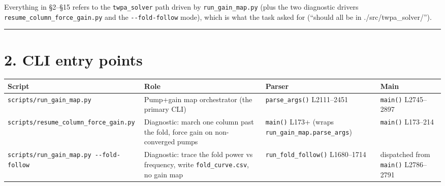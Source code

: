 \documentclass[
  10pt,
]{article}
\newcounter{none} %
\begin{document}
Everything in §2--§15 refers to the \texttt{twpa\_solver} path driven by
\texttt{run\_gain\_map.py} (plus the two diagnostic drivers
\texttt{resume\_column\_force\_gain.py} and the \texttt{-\/-fold-follow}
mode), which is what the task asked for (``should all be in
./src/twpa\_solver/'').

\begin{center}\rule{0.5\linewidth}{0.5pt}\end{center}

\section{2. CLI entry points}\label{cli-entry-points}

{\def\LTcaptype{none} %
\begin{longtable}[]{@{}
  >{\raggedright\arraybackslash}p{}
  >{\raggedright\arraybackslash}p{}
  >{\raggedright\arraybackslash}p{}
  >{\raggedright\arraybackslash}p{}@{}}
\toprule\noalign{}
\begin{minipage}[b]{\linewidth}\raggedright
Script
\end{minipage} & \begin{minipage}[b]{\linewidth}\raggedright
Role
\end{minipage} & \begin{minipage}[b]{\linewidth}\raggedright
Parser
\end{minipage} & \begin{minipage}[b]{\linewidth}\raggedright
Main
\end{minipage} \\
\midrule\noalign{}
\endhead
\bottomrule\noalign{}
\endlastfoot
\texttt{scripts/run\_gain\_map.py} & Pump+gain map orchestrator (the
primary CLI) & \texttt{parse\_args()} L2111--2451 & \texttt{main()}
L2745--2897 \\
\texttt{scripts/resume\_column\_force\_gain.py} & Diagnostic: march one
column past the fold, force gain on non-converged pumps &
\texttt{main()} L173+ (wraps \texttt{run\_gain\_map.parse\_args}) &
\texttt{main()} L173--214 \\
\texttt{scripts/run\_gain\_map.py\ -\/-fold-follow} & Diagnostic: trace
the fold power vs frequency, write \texttt{fold\_curve.csv}, no gain map
& \texttt{run\_fold\_follow()} L1680--1714 & dispatched from
\texttt{main()} L2786--2791 \\
\end{longtable}
}
\end{document}
